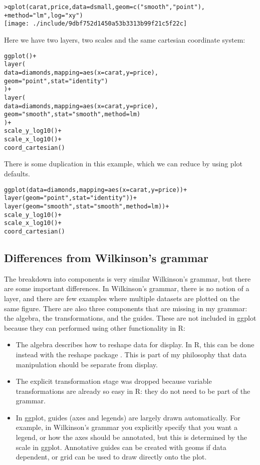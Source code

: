\begin{alltt}
> qplot(carat, price, data = dsmall, geom = c("smooth", "point"), 
+     method = "lm", log = "xy")
\texttt{[image: ./include/9dbf752d1450a53b3313b99f21c5f22c]}

\end{alltt}

Here we have two layers, two scales and the same cartesian coordinate system:

\begin{alltt}
ggplot() + 
layer(
   data = diamonds, mapping = aes(x = carat, y = price),
   geom = "point", stat = "identity")
) + 
layer(
   data = diamonds, mapping = aes(x = carat, y = price),
   geom = "smooth", stat = "smooth", method = lm)
) + 
scale_y_log10() + 
scale_x_log10() + 
coord_cartesian()
\end{alltt}

There is some duplication in this example, which we can reduce by using plot defaults.

\begin{alltt}
ggplot(data = diamonds, mapping = aes(x = carat, y = price)) + 
layer(geom = "point", stat = "identity")) + 
layer(geom = "smooth", stat = "smooth", method = lm)) + 
scale_y_log10() + 
scale_x_log10() + 
coord_cartesian()
\end{alltt}

\subsection{Differences from Wilkinson's grammar}

The breakdown into components is very similar Wilkinson's grammar, but there are some important differences.  In Wilkinson's grammar, there is no notion of a layer, and there are few examples where multiple datasets are plotted on the same figure.  There are also three components that are missing in my grammar: the algebra, the transformations, and the guides.  These are not included in ggplot because they can performed using other functionality in R:

\begin{itemize}
	\item The algebra describes how to reshape data for display.  In R, this can be done instead with the reshape package \citep{reshape}.  This is part of my philosophy that data manipulation should be separate from display.

	\item The explicit transformation stage was dropped because variable transformations are already so easy in R: they do not need to be part of the grammar.
	
	\item In ggplot, guides (axes and legends) are largely drawn automatically.  For example, in Wilkinson's grammar you explicitly specify that you want a legend, or how the axes should be annotated, but this is determined by the scale in ggplot.  Annotative guides can be created with geoms if data dependent, or grid can be used to draw directly onto the plot.
\end{itemize}

